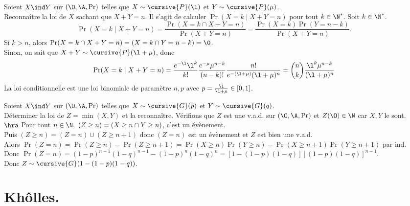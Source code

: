 \documentclass[11pt]{article}
\begin{document}
\begin{exercice}{}{}
    Soient $X\ind Y$ sur $(\O,\A,\Pr)$ telles que $X\sim\cursive{P}(\l)$ et $Y\sim\cursive{P}(\mu)$.\\
    Reconnaître la loi de $X$ sachant que $X+Y=n$.
    \tcblower
    Il s'agit de calculer $\Pr(X=k\mid X+Y=n)$ pour tout $k\in\N^*$. Soit $k\in\N^*$.
    \begin{equation*}
        \Pr(X=k \mid X+Y=n) = \frac{\Pr(X=k \cap X+Y=n)}{\Pr(X+Y=n)} = \frac{\Pr(X=k)\Pr(Y=n-k)}{\Pr(X+Y=n)}.
    \end{equation*}
    Si $k>n$, alors $\Pr(X=k\cap X+Y=n)=(X=k\cap Y=n-k)=\0$.\\
    Sinon, on sait que $X+Y\sim \cursive{P}(\l + \mu)$, donc \begin{equation*}\Pr(X=k\mid X+Y=n)=\frac{e^{-\l}\l^k}{k!}\frac{e^{-\mu}\mu^{n-k}}{(n-k)!}\frac{n!}{e^{-(\l+\mu)}(\l+\mu)^n}=\binom{n}{k}\frac{\l^k\mu^{n-k}}{(\l+\mu)^n}\end{equation*}
    La loi conditionnelle est une loi binomiale de paramètre $n,p$ avec $p=\frac{\l}{\l+\mu}\in[0,1]$.
\end{exercice}

\vspace*{-0.8cm}

\begin{exercice}{}{}
    Soient $X\ind Y$ sur $(\O,\A,\Pr)$ telles que $X\sim\cursive{G}(p)$ et $Y\sim\cursive{G}(q)$.\\
    Déterminer la loi de $Z=\min(X,Y)$ et la reconnaître.
    \tcblower
    Vérifions que $Z$ est une v.a.d. sur $(\O,\A,\Pr)$ et $Z(\O)\in\N$ car $X,Y$ le sont.\\
    $\hra$ Pour tout $n\in\N, ~ (Z\geq n) = (X\geq n \cap Y \geq n)$, c'est un évènement.\\
    Puis $(Z\geq n)=(Z = n) \cup (Z \geq n+1)$ donc $(Z=n)$ est un évènement et $Z$ est bien une v.a.d.\\
    Alors $\Pr(Z = n) = \Pr(Z \geq n) - \Pr(Z \geq n+1) = \Pr(X \geq n)\Pr(Y \geq n) - \Pr(X \geq n+1)\Pr(Y\geq n+1)$ par ind.\\
    Donc $\Pr(Z=n)=(1-p)^{n-1}(1-q)^{n-1} - (1-p)^n(1-q)^n = \left[ 1 - (1-p)(1-q) \right]\left[(1-p)(1-q)\right]^{n-1}$.\\
    Donc $Z\sim\cursive{G}(1-(1-p)(1-q))$.
\end{exercice}

\section{Khôlles.}
\end{document}
